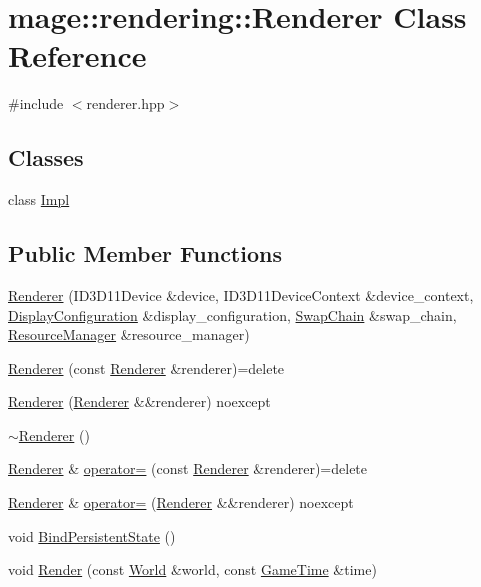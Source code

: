 \hypertarget{classmage_1_1rendering_1_1_renderer}{}\section{mage\+:\+:rendering\+:\+:Renderer Class Reference}
\label{classmage_1_1rendering_1_1_renderer}


{\ttfamily \#include $<$renderer.\+hpp$>$}

\subsection*{Classes}
\begin{DoxyCompactItemize}
\item 
class \hyperlink{classmage_1_1rendering_1_1_renderer_1_1_impl}{Impl}
\end{DoxyCompactItemize}
\subsection*{Public Member Functions}
\begin{DoxyCompactItemize}
\item 
\hyperlink{classmage_1_1rendering_1_1_renderer_a8e517a323bb67bf8b347ff46204ccec9}{Renderer} (I\+D3\+D11\+Device \&device, I\+D3\+D11\+Device\+Context \&device\+\_\+context, \hyperlink{classmage_1_1rendering_1_1_display_configuration}{Display\+Configuration} \&display\+\_\+configuration, \hyperlink{classmage_1_1rendering_1_1_swap_chain}{Swap\+Chain} \&swap\+\_\+chain, \hyperlink{classmage_1_1rendering_1_1_resource_manager}{Resource\+Manager} \&resource\+\_\+manager)
\item 
\hyperlink{classmage_1_1rendering_1_1_renderer_adf10b0a249959f9a9fff5714c537bbd8}{Renderer} (const \hyperlink{classmage_1_1rendering_1_1_renderer}{Renderer} \&renderer)=delete
\item 
\hyperlink{classmage_1_1rendering_1_1_renderer_aab7768b815e740173a20e10795a6f93e}{Renderer} (\hyperlink{classmage_1_1rendering_1_1_renderer}{Renderer} \&\&renderer) noexcept
\item 
\hyperlink{classmage_1_1rendering_1_1_renderer_ab5c0553ac8a095f55eab371b843b354b}{$\sim$\+Renderer} ()
\item 
\hyperlink{classmage_1_1rendering_1_1_renderer}{Renderer} \& \hyperlink{classmage_1_1rendering_1_1_renderer_a23338d210ca0008a05cf060f35d4dc70}{operator=} (const \hyperlink{classmage_1_1rendering_1_1_renderer}{Renderer} \&renderer)=delete
\item 
\hyperlink{classmage_1_1rendering_1_1_renderer}{Renderer} \& \hyperlink{classmage_1_1rendering_1_1_renderer_a8f0f0323dc57cf2e1f76491bf6eaa97a}{operator=} (\hyperlink{classmage_1_1rendering_1_1_renderer}{Renderer} \&\&renderer) noexcept
\item 
void \hyperlink{classmage_1_1rendering_1_1_renderer_a7fa8fd234b69dabc51d7a214afb641b3}{Bind\+Persistent\+State} ()
\item 
void \hyperlink{classmage_1_1rendering_1_1_renderer_abbab1dd0a3a4eb06cb6fd4f0a75eb192}{Render} (const \hyperlink{classmage_1_1rendering_1_1_world}{World} \&world, const \hyperlink{classmage_1_1_game_time}{Game\+Time} \&time)
\end{DoxyCompactItemize}
